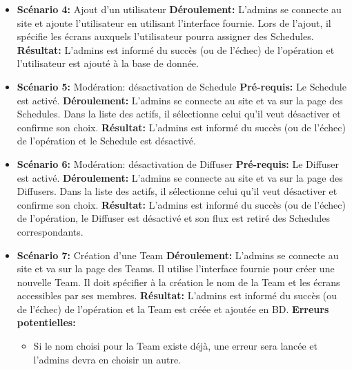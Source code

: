 \documentclass[french]{article}
\begin{document}
\begin{appendices}
\begin{itemize}
		\item \textbf{Scénario 4:} Ajout d'un utilisateur\newline
		\textbf{Déroulement:} L'admins se connecte au site et ajoute l'utilisateur en utilisant l'interface fournie. Lors de l'ajout, il spécifie les écrans auxquels l'utilisateur pourra assigner des Schedules.\newline
		\textbf{Résultat:} L'admins est informé du succès (ou de l'échec) de l'opération et l'utilisateur est ajouté à la base de donnée.\newline

		\item \textbf{Scénario 5:} Modération: désactivation de Schedule\newline
		\textbf{Pré-requis:} Le Schedule est activé.\newline
		\textbf{Déroulement:} L'admins se connecte au site et va sur la page des Schedules. Dans la liste des actifs, il sélectionne celui qu'il veut désactiver et confirme son choix.\newline
		\textbf{Résultat:} L'admins est informé du succès (ou de l'échec) de l'opération et le Schedule est désactivé.\newline
		
		\item \textbf{Scénario 6:} Modération: désactivation de Diffuser\newline
		\textbf{Pré-requis:} Le Diffuser est activé.\newline
		\textbf{Déroulement:} L'admins se connecte au site et va sur la page des Diffusers. Dans la liste des actifs, il sélectionne celui qu'il veut désactiver et confirme son choix.\newline
		\textbf{Résultat:} L'admins est informé du succès (ou de l'échec) de l'opération, le Diffuser est désactivé et son flux est retiré des Schedules correspondants.\newline
		
		\item \textbf{Scénario 7:} Création d'une Team\newline
		\textbf{Déroulement:} L'admins se connecte au site et va sur la page des Teams. Il utilise l'interface fournie pour créer une nouvelle Team. Il doit spécifier à la création le nom de la Team et les écrans accessibles par ses membres. \newline
		\textbf{Résultat:} L'admins est informé du succès (ou de l'échec) de l'opération et la Team est créée et ajoutée en BD.\newline
		\textbf{Erreurs potentielles:} 
			\begin{itemize}
				\item Si le nom choisi pour la Team existe déjà, une erreur sera lancée et l'admins devra en choisir un autre.
			\end{itemize}
			

\end{itemize}
\end{appendices}
\end{document}
